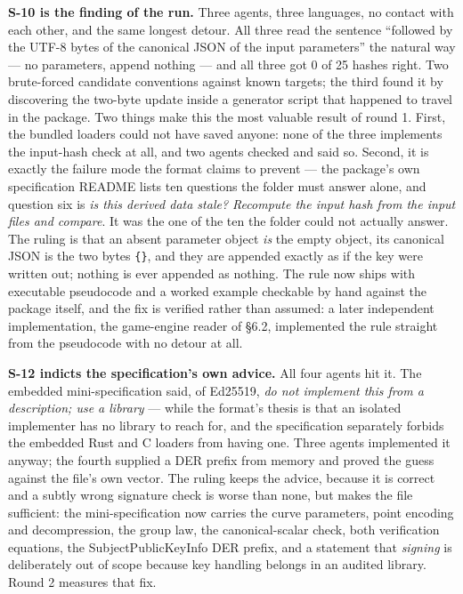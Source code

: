 \documentclass[10pt,twocolumn,letterpaper]{article}
\newcommand{\code}[1]{\texttt{\small #1}}
\begin{document}
\textbf{S-10 is the finding of the run.} Three agents, three languages, no contact with each other, and the same longest detour. All three read the sentence ``followed by the UTF-8 bytes of the canonical JSON of the input parameters'' the natural way --- no parameters, append nothing --- and all three got 0 of 25 hashes right. Two brute-forced candidate conventions against known targets; the third found it by discovering the two-byte update inside a generator script that happened to travel in the package. Two things make this the most valuable result of round 1. First, the bundled loaders could not have saved anyone: none of the three implements the input-hash check at all, and two agents checked and said so. Second, it is exactly the failure mode the format claims to prevent --- the package's own specification README lists ten questions the folder must answer alone, and question six is \emph{is this derived data stale? Recompute the input hash from the input files and compare}. It was the one of the ten the folder could not actually answer. The ruling is that an absent parameter object \emph{is} the empty object, its canonical JSON is the two bytes \code{\{\}}, and they are appended exactly as if the key were written out; nothing is ever appended as nothing. The rule now ships with executable pseudocode and a worked example checkable by hand against the package itself, and the fix is verified rather than assumed: a later independent implementation, the game-engine reader of \S6.2, implemented the rule straight from the pseudocode with no detour at all.

\textbf{S-12 indicts the specification's own advice.} All four agents hit it. The embedded mini-specification said, of Ed25519, \emph{do not implement this from a description; use a library} --- while the format's thesis is that an isolated implementer has no library to reach for, and the specification separately forbids the embedded Rust and C loaders from having one. Three agents implemented it anyway; the fourth supplied a DER prefix from memory and proved the guess against the file's own vector. The ruling keeps the advice, because it is correct and a subtly wrong signature check is worse than none, but makes the file sufficient: the mini-specification now carries the curve parameters, point encoding and decompression, the group law, the canonical-scalar check, both verification equations, the SubjectPublicKeyInfo DER prefix, and a statement that \emph{signing} is deliberately out of scope because key handling belongs in an audited library. Round 2 measures that fix.
\end{document}
